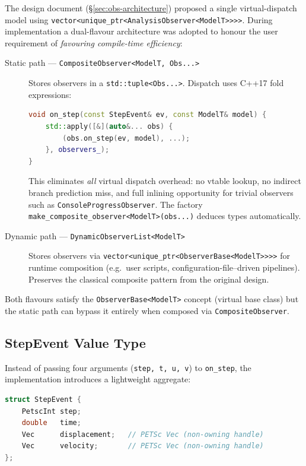 The design document (\S\ref{sec:obs-architecture}) proposed a single
virtual-dispatch model using
\texttt{vector<unique\_ptr<AnalysisObserver<ModelT>{}>{}>{}>}.
During implementation a dual-flavour architecture was adopted to
honour the user requirement of \emph{favouring compile-time efficiency}:

\begin{description}
  \item[Static path --- \texttt{CompositeObserver<ModelT, Obs...>}]
    Stores observers in a \texttt{std::tuple<Obs...>}.
    Dispatch uses C++17 fold expressions:
\begin{lstlisting}[language=C++,basicstyle=\ttfamily\small]
void on_step(const StepEvent& ev, const ModelT& model) {
    std::apply([&](auto&... obs) {
        (obs.on_step(ev, model), ...);
    }, observers_);
}
\end{lstlisting}
    This eliminates \emph{all} virtual dispatch overhead: no vtable
    lookup, no indirect branch prediction miss, and full inlining
    opportunity for trivial observers such as
    \texttt{ConsoleProgressObserver}.  The factory
    \texttt{make\_composite\_observer<ModelT>(obs...)} deduces types
    automatically.

  \item[Dynamic path --- \texttt{DynamicObserverList<ModelT>}]
    Stores observers via
    \texttt{vector<unique\_ptr<ObserverBase<ModelT>{}>{}>{}>}
    for runtime composition (e.g.\ user
    scripts, configuration-file--driven pipelines).  Preserves the
    classical composite pattern from the original design.
\end{description}

Both flavours satisfy the \texttt{ObserverBase<ModelT>} concept (virtual
base class) but the static path can bypass it entirely when composed via
\texttt{CompositeObserver}.

\subsection{StepEvent Value Type}
\label{sec:impl-step-event}

Instead of passing four arguments (\texttt{step, t, u, v}) to
\texttt{on\_step}, the implementation introduces a lightweight
aggregate:

\begin{lstlisting}[language=C++,basicstyle=\ttfamily\small]
struct StepEvent {
    PetscInt step;
    double   time;
    Vec      displacement;   // PETSc Vec (non-owning handle)
    Vec      velocity;       // PETSc Vec (non-owning handle)
};
\end{lstlisting}

